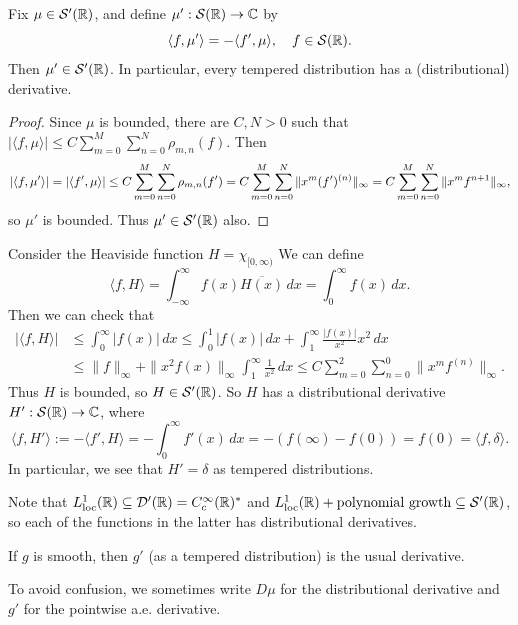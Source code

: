 \begin{prop}
  Fix $\mu \in \mathcal{S}'(\mathbb{R})$, and
  define $\mu' : \mathcal{S}(\mathbb{R}) \to \mathbb{C}$
  by
  \[
    \langle f, \mu' \rangle
    = -\langle f', \mu \rangle, \quad f \in \mathcal{S}(\mathbb{R}).
  \]
  Then $\mu' \in \mathcal{S}'(\mathbb{R})$.
  In particular, every
  tempered distribution has a
  (distributional) derivative.
\end{prop}

\begin{proof}
  Since $\mu$ is bounded,
  there are $C, N > 0$ such that
  $|\langle f, \mu \rangle| \le C \sum_{m = 0}^M \sum_{n = 0}^N \rho_{m, n}(f)$.
  Then
  \[
    |\langle f, \mu' \rangle|
    = |\langle f', \mu \rangle|
    \le C \sum_{m = 0}^M \sum_{n = 0}^N \rho_{m, n}(f')
    = C \sum_{m = 0}^M \sum_{n = 0}^N
    \|x^m (f')^{(n)}\|_\infty \\
    = C \sum_{m = 0}^M \sum_{n = 0}^N
    \|x^m f^{n + 1}\|_\infty,
  \]
  so $\mu'$ is bounded. Thus $\mu' \in \mathcal{S}'(\mathbb{R})$ also.
\end{proof}

\begin{example}
  Consider the Heaviside
  function $H = \chi_{[0, \infty)}$
  We can define
  \[
    \langle f, H \rangle
    = \int_{-\infty}^\infty f(x) \overline{H(x)} \, dx
    = \int_0^\infty f(x) \, dx.
  \]
  Then we can check that
  \begin{align*}
    |\langle f, H \rangle|
    &\le \int_0^\infty |f(x)|\, dx
    \le \int_0^1 |f(x)|\, dx
    + \int_1^\infty \frac{|f(x)|}{x^2} x^2 \, dx \\
    &\le \|f\|_\infty
    + \|x^2 f(x)\|_\infty \int_1^\infty \frac{1}{x^2} \, dx
    \le C \sum_{m = 0}^2 \sum_{n = 0}^0
    \|x^m f^{(n)}\|_\infty.
  \end{align*}
  Thus $H$ is bounded, so
  $H \in \mathcal{S}'(\mathbb{R})$. 
  So $H$ has a distributional
  derivative $H' : \mathcal{S}(\mathbb{R}) \to \mathbb{C}$,
  where
  \[
    \langle f, H' \rangle
    := - \langle f', H \rangle
    = -\int_0^\infty f'(x)\, dx
    = -(f(\infty) - f(0))
    = f(0) = \langle f, \delta \rangle.
  \]
  In particular, we see that
  $H' = \delta$ as tempered
  distributions.
\end{example}

\begin{remark}
  Note that
  $L^1_\mathrm{loc}(\mathbb{R}) \subseteq \mathcal{D}'(\mathbb{R}) = C_c^\infty(\mathbb{R})^*$
  and $L^1_\mathrm{loc}(\mathbb{R}) + \text{polynomial growth} \subseteq \mathcal{S}'(\mathbb{R})$,
  so each of the functions
  in the latter
  has distributional derivatives.
\end{remark}

\begin{exercise}
  If $g$ is smooth, then
  $g'$ (as a tempered distribution)
  is the usual derivative.
\end{exercise}

\begin{remark}
  To avoid confusion, we sometimes
  write $D\mu$ for the
  distributional derivative
  and $g'$ for the pointwise a.e.
  derivative.
\end{remark}
